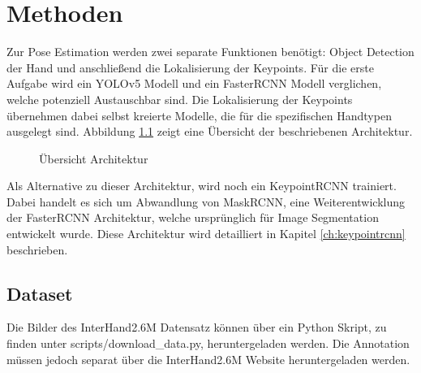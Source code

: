 \chapter{Methoden}\label{ch:methods}

Zur Pose Estimation werden zwei separate Funktionen benötigt: Object Detection der Hand und anschließend die Lokalisierung der Keypoints.
Für die erste Aufgabe wird ein YOLOv5 Modell \cite{yolov5} und ein FasterRCNN Modell \cite{fasterrcnn} verglichen, welche potenziell Austauschbar sind.
Die Lokalisierung der Keypoints übernehmen dabei selbst kreierte Modelle, die für die spezifischen Handtypen ausgelegt sind.
Abbildung \ref{fig:arch} zeigt eine Übersicht der beschriebenen Architektur. \\
\begin{figure}[!htb]
    \centering
    \caption{Übersicht Architektur}
    \label{fig:arch}
\end{figure} 

Als Alternative zu dieser Architektur, wird noch ein KeypointRCNN \cite{keypointrcnn} trainiert.
Dabei handelt es sich um Abwandlung von MaskRCNN, eine Weiterentwicklung der FasterRCNN Architektur, welche ursprünglich für Image Segmentation entwickelt wurde.
Diese Architektur wird detailliert in Kapitel \ref{ch:keypointrcnn} beschrieben.

\section{Dataset}\label{ch:dataset}
Die Bilder des InterHand2.6M Datensatz können über ein Python Skript, zu finden unter scripts/download\_data.py, heruntergeladen werden. 
Die Annotation müssen jedoch separat über die InterHand2.6M Website \cite{interhand_website} heruntergeladen werden. \\

